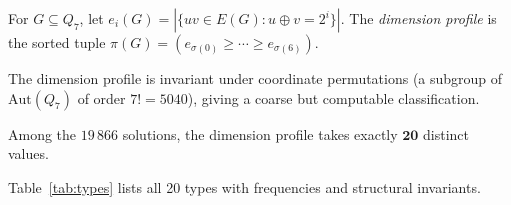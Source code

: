 \documentclass[12pt]{article}
\begin{document}
\begin{definition}
For $G\subseteq Q_7$, let $e_i(G)=|\{uv\in E(G):u\oplus v=2^i\}|$.
The \emph{dimension profile} is the sorted tuple
$\pi(G)=(e_{\sigma(0)}\ge\cdots\ge e_{\sigma(6)})$.
\end{definition}

The dimension profile is invariant under coordinate permutations (a subgroup
of $\mathrm{Aut}(Q_7)$ of order $7!=5040$), giving a coarse but computable
classification.

\begin{proposition}\label{prop:twenty}
Among the $19\,866$ solutions, the dimension profile takes exactly
$\mathbf{20}$ distinct values.
\end{proposition}

Table~\ref{tab:types} lists all 20 types with frequencies and structural invariants.
\end{document}
